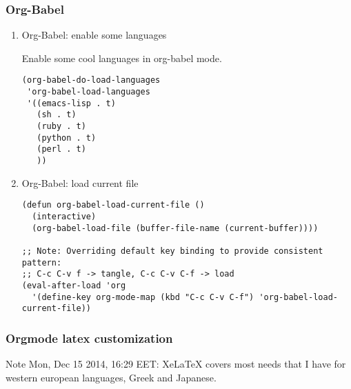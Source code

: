 \documentclass[nofonts]{tufte-handout}
\begin{document}
\subsubsection{Org-Babel}
\label{sec-2-5-10}
\begin{enumerate}
\item Org-Babel: enable some languages
\label{sec-2-5-10-1}

Enable some cool languages in org-babel mode.

\begin{verbatim}
(org-babel-do-load-languages
 'org-babel-load-languages
 '((emacs-lisp . t)
   (sh . t)
   (ruby . t)
   (python . t)
   (perl . t)
   ))
\end{verbatim}
\item Org-Babel: load current file
\label{sec-2-5-10-2}

\begin{verbatim}
(defun org-babel-load-current-file ()
  (interactive)
  (org-babel-load-file (buffer-file-name (current-buffer))))

;; Note: Overriding default key binding to provide consistent pattern:
;; C-c C-v f -> tangle, C-c C-v C-f -> load
(eval-after-load 'org
  '(define-key org-mode-map (kbd "C-c C-v C-f") 'org-babel-load-current-file))
\end{verbatim}
\end{enumerate}


\subsubsection{Orgmode latex customization}
\label{sec-2-5-11}

Note Mon, Dec 15 2014, 16:29 EET: XeLaTeX covers most needs that I have for western european languages, Greek and Japanese.
\end{document}
